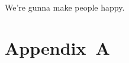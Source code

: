 \documentclass[12pt,a4paper]{article}
\begin{document}



We're gunna make people happy.











\section*{Appendix~A}



















\end{document}
